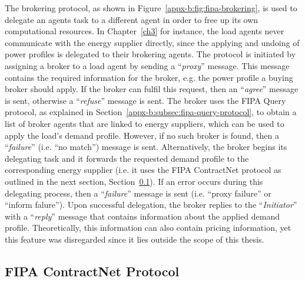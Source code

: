 

The brokering protocol, as shown in Figure~\ref{appx-b:fig:fipa-brokering}, is used to delegate an agents task to a different agent in order to free up its own computational resources.
In Chapter~\ref{ch3} for instance, the load agents never communicate with the energy supplier directly, since the applying and undoing of power profiles is delegated to their brokering agents.
The protocol is initiated by assigning a broker to a load agent by sending a ``\textit{proxy}'' message.
This message contains the required information for the broker, e.g. the power profile a buying broker should apply.
If the broker can fulfil this request, then an ``\textit{agree}'' message is sent, otherwise a ``\textit{refuse}'' message is sent.
The broker uses the FIPA Query protocol, as explained in Section~\ref{appx-b:subsec:fipa-query-protocol}, to obtain a list of broker agents that are linked to energy suppliers, which can be used to apply the load's demand profile.
However, if no such broker is found, then a ``\textit{failure}'' (i.e. ``no match'') message is sent.
Alternatively, the broker begins its delegating task and it forwards the requested demand profile to the corresponding energy supplier (i.e. it uses the FIPA ContractNet protocol as outlined in the next section, Section~\ref{appx-b:subsec:fipa-contract-net-protocol}).
If an error occurs during this delegating process, then a ``\textit{failure}'' message is sent (i.e. ``proxy failure'' or ``inform falure'').
Upon successful delegation, the broker replies to the ``\textit{Initiator}'' with a ``\textit{reply}'' message that contains information about the applied demand profile.
Theoretically, this information can also contain pricing information, yet this feature was disregarded since it lies outside the scope of this thesis.

\subsection{FIPA ContractNet Protocol}
\label{appx-b:subsec:fipa-contract-net-protocol}



